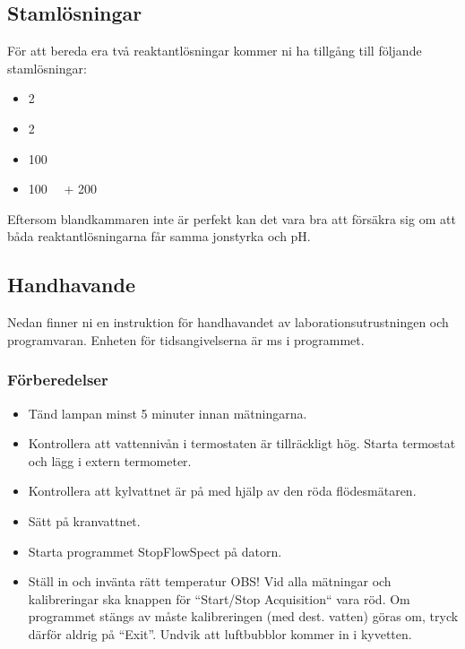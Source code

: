 \subsection{Stamlösningar}
För att bereda era två reaktantlösningar kommer ni ha tillgång till följande
stamlösningar:

\begin{itemize}
\item \SI{2}{\Molar} 
\item \SI{2}{\Molar} 
\item \SI{100}{\milli\Molar} 
\item \SI{100}{\milli\Molar}  + \SI{200}{\milli\Molar} 
\end{itemize}

Eftersom blandkammaren inte är perfekt kan det vara bra att försäkra sig
om att båda reaktantlösningarna får samma jonstyrka och pH.

\subsection{Handhavande}
\label{sec:handhavande}
Nedan finner ni en instruktion för handhavandet av
laborationsutrustningen och programvaran. Enheten för tidsangivelserna är
\si{\milli\second} i programmet.

\subsubsection{Förberedelser}
\begin{itemize}
\item Tänd lampan minst 5 minuter innan mätningarna.
\item Kontrollera att vattennivån i termostaten är tillräckligt hög.
Starta termostat och lägg i extern termometer.
\item Kontrollera att kylvattnet är på med hjälp av den röda flödesmätaren.
\item Sätt på kranvattnet.
\item Starta programmet StopFlowSpect på datorn.
\item Ställ in och invänta rätt temperatur OBS! Vid alla mätningar och
  kalibreringar ska knappen för ``Start/Stop Acquisition`` vara röd. Om
  programmet stängs av måste kalibreringen (med dest. vatten) göras om,
  tryck därför aldrig på ``Exit''. Undvik att luftbubblor kommer in i
  kyvetten.
\end{itemize}
